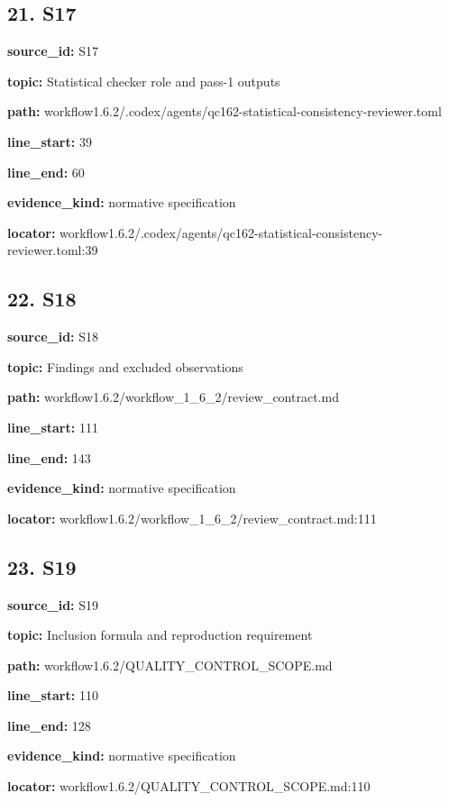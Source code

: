 \documentclass[10pt,a4paper]{article}
\begin{document}
\subsection*{21.\allowbreak{} S17}
\textbf{source\_\allowbreak{}id:} S17\par
\textbf{topic:} Statistical checker role and pass-\allowbreak{}1 outputs\par
\textbf{path:} workflow1.\allowbreak{}6.\allowbreak{}2/\allowbreak{}.\allowbreak{}codex/\allowbreak{}agents/\allowbreak{}qc162-\allowbreak{}statistical-\allowbreak{}consistency-\allowbreak{}reviewer.\allowbreak{}toml\par
\textbf{line\_\allowbreak{}start:} 39\par
\textbf{line\_\allowbreak{}end:} 60\par
\textbf{evidence\_\allowbreak{}kind:} normative specification\par
\textbf{locator:} workflow1.\allowbreak{}6.\allowbreak{}2/\allowbreak{}.\allowbreak{}codex/\allowbreak{}agents/\allowbreak{}qc162-\allowbreak{}statistical-\allowbreak{}consistency-\allowbreak{}reviewer.\allowbreak{}toml:39\par
\subsection*{22.\allowbreak{} S18}
\textbf{source\_\allowbreak{}id:} S18\par
\textbf{topic:} Findings and excluded observations\par
\textbf{path:} workflow1.\allowbreak{}6.\allowbreak{}2/\allowbreak{}workflow\_\allowbreak{}1\_\allowbreak{}6\_\allowbreak{}2/\allowbreak{}review\_\allowbreak{}contract.\allowbreak{}md\par
\textbf{line\_\allowbreak{}start:} 111\par
\textbf{line\_\allowbreak{}end:} 143\par
\textbf{evidence\_\allowbreak{}kind:} normative specification\par
\textbf{locator:} workflow1.\allowbreak{}6.\allowbreak{}2/\allowbreak{}workflow\_\allowbreak{}1\_\allowbreak{}6\_\allowbreak{}2/\allowbreak{}review\_\allowbreak{}contract.\allowbreak{}md:111\par
\subsection*{23.\allowbreak{} S19}
\textbf{source\_\allowbreak{}id:} S19\par
\textbf{topic:} Inclusion formula and reproduction requirement\par
\textbf{path:} workflow1.\allowbreak{}6.\allowbreak{}2/\allowbreak{}QUALITY\_\allowbreak{}CONTROL\_\allowbreak{}SCOPE.\allowbreak{}md\par
\textbf{line\_\allowbreak{}start:} 110\par
\textbf{line\_\allowbreak{}end:} 128\par
\textbf{evidence\_\allowbreak{}kind:} normative specification\par
\textbf{locator:} workflow1.\allowbreak{}6.\allowbreak{}2/\allowbreak{}QUALITY\_\allowbreak{}CONTROL\_\allowbreak{}SCOPE.\allowbreak{}md:110\par
\end{document}
